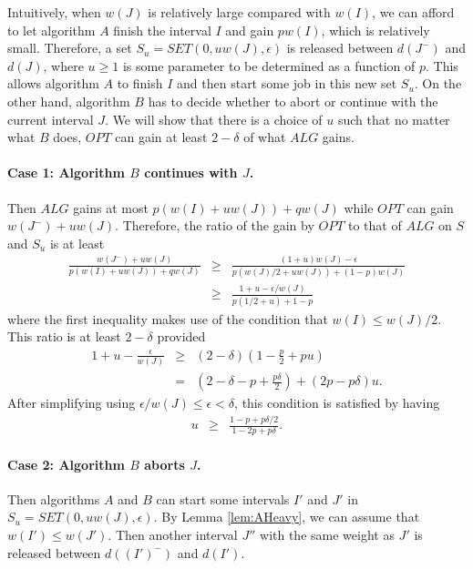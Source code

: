 \documentclass[11pt]{article}
\begin{document}
Intuitively, when $w(J)$ is relatively large compared with $w(I)$,
we can afford to let algorithm $A$ finish the interval $I$
and gain $pw(I)$, which is relatively small.
Therefore, a set $S_u = SET(0,u w(J),\epsilon)$ is released 
between $d(J^-)$ and $d(J)$,
where $u \geq 1$ is some parameter to be determined
as a function of $p$.
This allows algorithm $A$ to finish $I$ and then start
some job in this new set $S_u$.
On the other hand, algorithm $B$ has to decide whether to
abort or continue with the current interval $J$.
We will show that there is a choice of $u$ such that no matter
what $B$ does, $OPT$ can gain at least $2-\delta$ of what $ALG$
gains.

\paragraph{Case 1: Algorithm $B$ continues with $J$.}

Then $ALG$ gains at most $p(w(I) + uw(J)) + qw(J)$
while $OPT$ can gain $w(J^-) + uw(J)$.
Therefore, the ratio of the gain by $OPT$ to that of $ALG$
on $S$ and $S_u$ is at least
\begin{eqnarray*}
\frac{ w(J^-) + uw(J) } { p(w(I)+uw(J)) + qw(J) } 
  & \geq & \frac{(1+u)w(J) - \epsilon} { p (w(J)/2 + uw(J)) + (1-p)w(J) } \\
  & \geq & \frac{1+u - \epsilon/w(J)} { p (1/2 + u) + 1-p }
\end{eqnarray*}
where the first inequality makes use of the condition that
$w(I) \leq w(J)/2$.
This ratio is at least $2-\delta$ provided
\begin{eqnarray*}
1 + u - \frac{\epsilon}{w(J)}
   & \geq & (2-\delta)(1 - \frac{p}{2} + pu) \\
   &  =   & (2 - \delta - p + \frac{p\delta}{2})
               + (2p - p\delta) u.
\end{eqnarray*}
After simplifying using $\epsilon/w(J) \leq \epsilon < \delta$,
this condition is satisfied by having
\begin{eqnarray}
u & \geq & \frac{1 - p + p\delta/2}
                {1 - 2p + p\delta}.
\end{eqnarray}

\paragraph{Case 2: Algorithm $B$ aborts $J$.}

Then algorithms $A$ and $B$ can start some intervals
$I'$ and $J'$ in $S_u = SET(0, uw(J), \epsilon)$.
By Lemma \ref{lem:AHeavy},
we can assume that $w(I') \leq w(J')$.
Then another interval $J''$ with the same weight as $J'$ 
is released between $d((I')^-)$ and $d(I')$.
\end{document}
